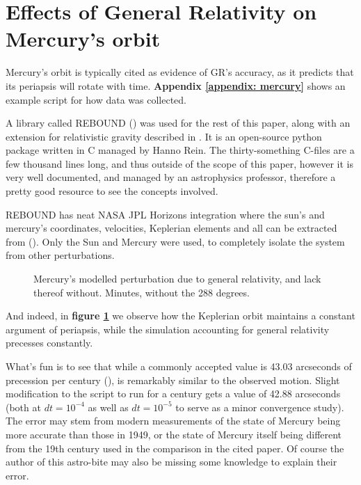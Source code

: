 \section{Effects of General Relativity on Mercury's orbit}
Mercury's orbit is typically cited as evidence of GR's accuracy, as it predicts that its periapsis will rotate with time. \textbf{Appendix \ref{appendix: mercury}} shows an example script for how data was collected.

A library called REBOUND (\cite{Rein_2012}) was used for the rest of this paper, along with an extension for relativistic gravity described in \cite{Tamayo_2019}. It is an open-source python package written in C managed by Hanno Rein. The thirty-something C-files are a few thousand lines long, and thus outside of the scope of this paper, however it is very well documented, and managed by an astrophysics professor, therefore a pretty good resource to see the concepts involved.

REBOUND has neat NASA JPL Horizons integration where the sun's and mercury's coordinates, velocities, Keplerian elements and all can be extracted from (\cite{Giorgini_1996}). Only the Sun and Mercury were used, to completely isolate the system from other perturbations.

\begin{figure}[h]
    \centering
    
    \caption{Mercury's modelled perturbation due to general relativity, and lack thereof without. Minutes, without the 288 degrees.}
    \label{fig: mercury GR}
\end{figure}

And indeed, in \textbf{figure \ref{fig: mercury GR}} we observe how the Keplerian orbit maintains a constant argument of periapsis, while the simulation accounting for general relativity precesses constantly.

 What's fun is to see that while a commonly accepted value is  43.03 arcseconds of precession per century (\cite{Clemence_1949}), is remarkably similar to the observed motion. Slight modification to the script to run for a century gets a value of 42.88 arcseconds (both at $dt = 10^{-4}$ as well as $dt = 10^{-5}$ to serve as a minor convergence study). The error may stem from modern measurements of the state of Mercury being more accurate than those in 1949, or the state of Mercury itself being different from the 19th century used in the comparison in the cited paper. Of course the author of this astro-bite may also be missing some knowledge to explain their error.
 
